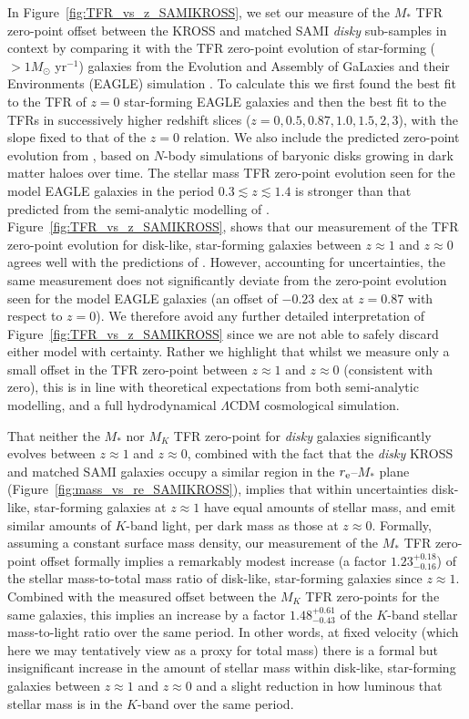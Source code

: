 \documentclass[a4paper,fleqn,usenatbib]{mnras}
\begin{document}
{In Figure~\ref{fig:TFR_vs_z_SAMIKROSS}, we set our measure of the $M_{*}$ TFR zero-point offset between the KROSS and matched SAMI \textit{disky} sub-samples in context by comparing it with the TFR zero-point evolution of star-forming ($>1M_{\odot}$ yr$^{-1}$) galaxies from the Evolution and Assembly of GaLaxies and their Environments (EAGLE) simulation \citep{Schaye:2015,Crain:2015,McAlpine:2015}. To calculate this we first found the best fit to the TFR of $z = 0$ star-forming EAGLE galaxies and then the best fit to the TFRs in successively higher redshift slices ($z = 0, 0.5, 0.87, 1.0, 1.5, 2, 3$), with the slope fixed to that of the $z = 0$ relation. We also include the predicted zero-point evolution from \citet{Dutton:2011}, based on $N$-body simulations of baryonic disks growing in dark matter haloes over time. The stellar mass TFR zero-point evolution seen for the model EAGLE galaxies in the period $0.3 \lesssim z \lesssim 1.4$  is stronger than that predicted from the semi-analytic modelling of \citet{Dutton:2011}. Figure~\ref{fig:TFR_vs_z_SAMIKROSS}, shows that our measurement of the TFR zero-point evolution for disk-like, star-forming galaxies between $z\approx1$ and $z\approx0$ agrees well with the predictions of \citet{Dutton:2011}. However, accounting for uncertainties, the same measurement does not significantly deviate from the zero-point evolution seen for the model EAGLE galaxies (an offset of $-0.23$ dex at $z = 0.87$ with respect to $z = 0$). We therefore avoid any further detailed interpretation of Figure~\ref{fig:TFR_vs_z_SAMIKROSS} since we are not able to safely discard either model with certainty. Rather we highlight that whilst we measure only a small offset in the TFR zero-point between $z\approx1$ and $z\approx0$ (consistent with zero), this is in line with theoretical expectations from both semi-analytic modelling, and a full hydrodynamical $\Lambda$CDM cosmological simulation.

That neither the $M_{*}$ nor $M_{K}$ TFR zero-point for \textit{disky} galaxies significantly evolves between $z\approx1$ and $z\approx0$, combined with the fact that the \textit{disky} KROSS and matched SAMI galaxies occupy a similar region in the $r_{\rm{e}}$--$M_{*}$ plane (Figure~\ref{fig:mass_vs_re_SAMIKROSS}), implies that within uncertainties disk-like, star-forming galaxies at $z\approx1$ have equal amounts of stellar mass, and emit similar amounts of $K$-band light, per dark mass as those at $z\approx0$. Formally, assuming a constant surface mass density, our measurement of the $M_{*}$ TFR zero-point offset formally implies a remarkably modest increase (a factor $1.23^{+0.18}_{-0.16}$) of the stellar mass-to-total mass ratio of disk-like, star-forming galaxies since $z\approx1$. Combined with the measured offset between the $M_{K}$ TFR zero-points for the same galaxies, this implies an increase  by a factor $1.48^{+0.61}_{-0.43}$ of the $K$-band stellar mass-to-light ratio over the same period. In other words, at fixed velocity (which here we may tentatively view as a proxy for total mass) there is a formal but insignificant increase in the amount of stellar mass within disk-like, star-forming galaxies between $z\approx1$ and $z\approx0$ and a slight reduction in how luminous that stellar mass is in the $K$-band over the same period.   

}
\end{document}
